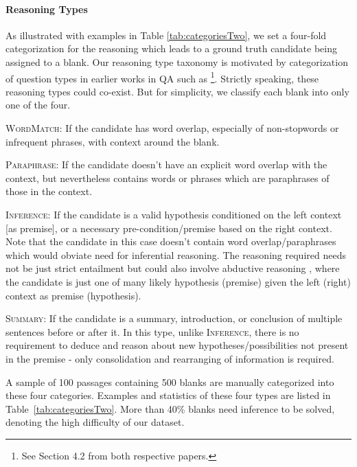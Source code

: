 \documentclass[11pt,a4paper]{article}
\newenvironment{tight_itemize}{
\begin{itemize}
  \setlength{\itemsep}{0pt}
  \setlength{\parskip}{0pt}
}{\end{itemize}}
\begin{document}
\paragraph{Reasoning Types}As illustrated with examples in Table \ref{tab:categoriesTwo}, we set a four-fold categorization for the reasoning which leads to a ground truth candidate being assigned to a blank. Our reasoning type taxonomy is motivated by categorization of question types in earlier works in QA such as \cite{chen2016thorough,trischler2017newsqa}\footnote{See Section 4.2 from both respective papers.}. Strictly speaking, these reasoning types could co-exist. But for simplicity, we classify each blank into only one of the four.
\begin{tight_itemize}
    \item \textsc{WordMatch}: If the candidate has word overlap, especially of non-stopwords or infrequent phrases, with context around the blank. 
    \item \textsc{Paraphrase}: If the candidate doesn't have an explicit word overlap with the context, but nevertheless contains words or phrases which are paraphrases of those in the context.
    \item \textsc{Inference}: If the candidate is a valid hypothesis conditioned on the left context [as premise], or a necessary pre-condition/premise based on the right context. Note that the candidate in this case doesn't contain word overlap/paraphrases which would obviate need for inferential reasoning. The reasoning required needs not be just strict entailment \cite{bowman2015large,marelli2014semeval} but could also involve abductive reasoning \cite{bhagavatula2019abductive}, where the candidate is just one of many likely hypothesis (premise) given the left (right) context as premise (hypothesis).
    \item \textsc{Summary}: 
    If the candidate is a summary, introduction, or conclusion of multiple sentences before or after it. 
    In this type, unlike  \textsc{Inference}, there is no requirement to deduce and reason about new hypotheses/possibilities not present in the premise - only consolidation and rearranging of information is required. 
\end{tight_itemize}
A sample of 100 passages containing 500 blanks are manually categorized into these four categories.
Examples and statistics of these four types are listed in Table~\ref{tab:categoriesTwo}. More than 40\% blanks need inference to be solved, denoting the high difficulty of our dataset. 
\end{document}
